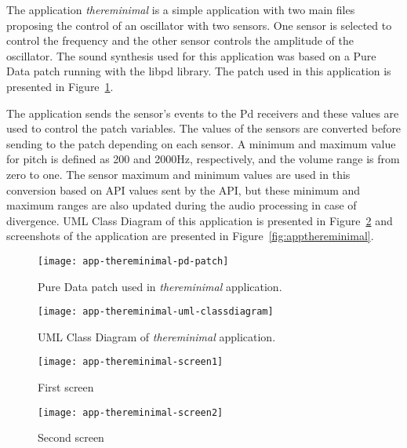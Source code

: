 The application \textit{thereminimal} is a simple application with two main files proposing the control of an oscillator with two sensors.
One sensor is selected to control the frequency and the other sensor controls the amplitude of the oscillator.
The sound synthesis used for this application was based on a Pure Data patch running with the libpd library.
The patch used in this application is presented in Figure~\ref{fig:thereminimal-pd-patch}.

The application sends the sensor's events to the Pd receivers and these values are used to control the patch variables.
The values of the sensors are converted before sending to the patch depending on each sensor.
A minimum and maximum value for pitch is defined as 200 and 2000Hz, respectively, and the volume range is from zero to one.
The sensor maximum and minimum values are used in this conversion based on API values sent by the API, but these minimum and maximum ranges are also updated during the audio processing in case of divergence. %
UML Class Diagram of this application is presented in Figure~\ref{fig:thereminimal-uml-classdiagram} and screenshots of the application are presented in Figure~\ref{fig:appthereminimal}.

\begin{figure}[!ht]
\centering
\texttt{[image: app-thereminimal-pd-patch]}
\caption{Pure Data patch used in \textit{thereminimal} application.}
\label{fig:thereminimal-pd-patch}
\end{figure}

\begin{figure}[!ht]
\centering
\texttt{[image: app-thereminimal-uml-classdiagram]}
\caption{UML Class Diagram of \textit{thereminimal} application.}
\label{fig:thereminimal-uml-classdiagram}
\end{figure}

\begin{figure*}[!ht]
\centering
\begin{subfigure}{.30\textwidth}
	\texttt{[image: app-thereminimal-screen1]}
    \caption{First screen}
	\label{fig:appthereminimalfirstscreen}
\end{subfigure}
\begin{subfigure}{.30\textwidth}
	\texttt{[image: app-thereminimal-screen2]}
	\caption{Second screen}
	\label{fig:appthereminimalsecondscreen}
\end{subfigure}

\caption{Screen-shots of \textit{thereminimal} application.}
\label{fig:appthereminimal}
\end{figure*}

